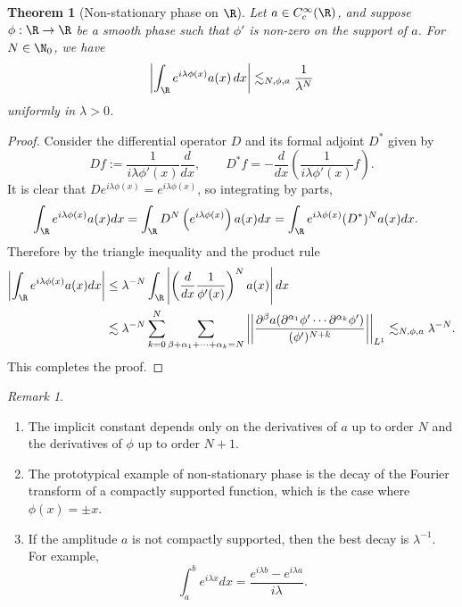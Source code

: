 \documentclass[reqno]{amsart}
\newtheorem{theorem}{Theorem}
\theoremstyle{definition}
\theoremstyle{remark}
\newtheorem*{remark}{Remark}
\begin{document}
\begin{theorem}[Non-stationary phase on $\R$]
	Let $a \in C^\infty_c (\R)$, and suppose $\phi : \R \to \R$ be a smooth phase such that $\phi'$ is non-zero on the support of $a$. For $N \in \N_0$, we have 
		\[ \left| \int_\R e^{i \lambda \phi(x)} a(x) \, dx \right| \lesssim_{N, \phi, a} \frac{1}{\lambda^N} \]
	uniformly in $\lambda > 0$. 	
\end{theorem}
\begin{proof}
	Consider the differential operator $D$ and its formal adjoint $D^*$ given by 
		\[ Df := \frac{1}{i \lambda \phi'(x)} \frac{d}{dx}, \qquad D^* f = - \frac{d}{dx} \left( \frac{1}{i \lambda \phi'(x)} f \right). \]
	It is clear that $D e^{i \lambda \phi(x)} = e^{i \lambda \phi(x)}$, so integrating by parts, 
	\begin{align*}
		\int_\R e^{i \lambda \phi(x)} a(x) dx
			&= \int_\R D^N \left(e^{i \lambda \phi(x)}\right) a(x) dx = \int_\R e^{i \lambda \phi(x)} (D^*)^N a(x) dx.
	\end{align*}
	Therefore by the triangle inequality and the product rule
		\begin{align*}
			 \left| \int_\R e^{i \lambda \phi(x)} a(x) dx \right| 
			 	&\leq \lambda^{-N} \int_\R \left| \left( \frac{d}{dx} \frac{1}{\phi'(x)} \right)^N a(x) \right| dx \\
			 	&\lesssim\lambda^{-N} \sum_{k = 0}^N \sum_{\beta + \alpha_1 + \dots + \alpha_k = N} \left|\left| \frac{\partial^\beta a ( \partial^{\alpha_1} \phi' \cdots \partial^{\alpha_k} \phi')}{(\phi')^{N + k}} \right|\right|_{L^1} \lesssim_{N, \phi, a} \lambda^{-N}. 
		\end{align*}	 
	This completes the proof. 	
\end{proof}

\begin{remark}
\leavevmode
\begin{enumerate}
	\item The implicit constant depends only on the derivatives of $a$ up to order $N$ and the derivatives of $\phi$ up to order $N + 1$. 	
	
	\item The prototypical example of non-stationary phase is the decay of the Fourier transform of a compactly supported function, which is the case where $\phi(x) = \pm x$. 
	
	\item If the amplitude $a$ is not compactly supported, then the best decay is $\lambda^{-1}$. For example,
		\[ \int_a^b e^{i \lambda x} dx = \frac{e^{i \lambda b} - e^{i \lambda a}}{i \lambda}. \]
\end{enumerate}	
\end{remark}
\end{document}
